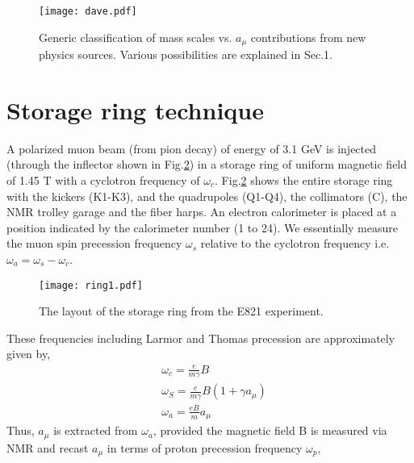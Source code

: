 \documentclass{article}
\begin{document}
\begin{center}
\begin{figure}[h]
\hspace{1.5 cm}
\texttt{[image: dave.pdf]}
\caption{\label{fig3}
Generic classification of mass scales vs. $a_{\mu}$ contributions from new physics sources.
Various possibilities are explained in Sec.1.}
\end{figure}
\end{center}
 
\section{Storage ring technique}
A polarized muon beam (from pion decay) of energy of 3.1 GeV is injected
(through the inflector shown in Fig.\ref{fig4}) in a storage ring of uniform magnetic field of 1.45 T 
with a cyclotron frequency of $\omega_c$. Fig.\ref{fig4} shows the entire storage ring with the
kickers (K1-K3), and the quadrupoles (Q1-Q4), the collimators (C), the
NMR trolley garage and the fiber harps. An electron calorimeter is placed at
a position indicated by the calorimeter number (1 to 24).
We essentially measure the muon spin precession frequency $\omega_s$ relative to
the cyclotron frequency i.e. $\omega_a = \omega_s - \omega_c$.
\begin{center}
\begin{figure}[h!]
\hspace{2 cm}
\texttt{[image: ring1.pdf]}
\caption{\label{fig4}The layout of the storage ring from the E821 experiment.}
\end{figure}
\end{center}
These frequencies including Larmor and Thomas precession are approximately given by,
\begin{equation}
\begin{aligned}
&\omega{_c} = \frac{e}{m\gamma}B\\
&\omega{_S} = \frac{e}{m\gamma}B(1 + \gamma a_{\mu})\\
&\omega{_a} = \frac{eB}{m}a{_\mu} 
\end{aligned}
\end{equation}
Thus, $a{_\mu}$ is extracted from $\omega{_a}$, provided the magnetic field B is
measured via NMR and recast $a{_\mu}$ in terms of proton precession frequency $\omega{_p}$,
\end{document}

